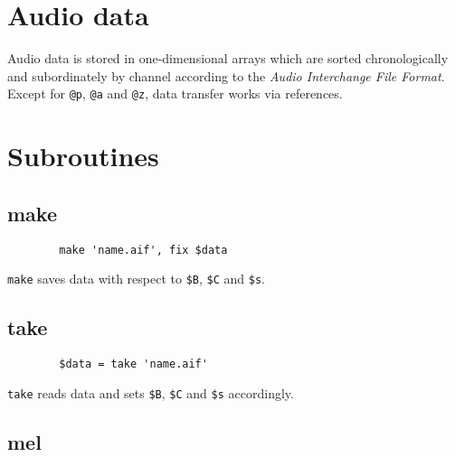 \documentclass[a4paper, 10pt]{article}
\begin{document}
	\section*{Audio data}

	Audio data is stored in one-dimensional arrays which are sorted chronologically and subordinately by channel according to the {\it Audio Interchange File Format}. Except for \verb|@p|, \verb|@a| and \verb|@z|, data transfer works via references.

	\section*{Subroutines}

	\subsection*{make}

	\begin{verbatim}
		make 'name.aif', fix $data
	\end{verbatim}
	\verb|make| saves data with respect to \verb|$B|, \verb|$C| and \verb|$s|.

	\subsection*{take}

	\begin{verbatim}
		$data = take 'name.aif'
	\end{verbatim}
	\verb|take| reads data and sets \verb|$B|, \verb|$C| and \verb|$s| accordingly.

	\subsection*{mel}
\end{document}
